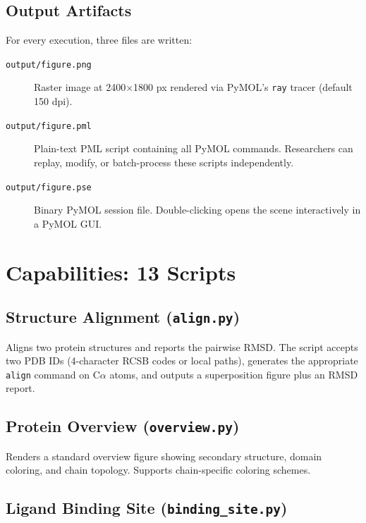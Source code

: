 \documentclass[12pt,a4paper]{article}
\begin{document}
\subsection{Output Artifacts}

For every execution, three files are written:

\begin{description}
  \item[\texttt{output/figure.png}] Raster image at 2400$\times$1800 px rendered via PyMOL's \texttt{ray} tracer (default 150 dpi).
  \item[\texttt{output/figure.pml}] Plain-text PML script containing all PyMOL commands. Researchers can replay, modify, or batch-process these scripts independently.
  \item[\texttt{output/figure.pse}] Binary PyMOL session file. Double-clicking opens the scene interactively in a PyMOL GUI.
\end{description}

\section{Capabilities: 13 Scripts}



\subsection{Structure Alignment (\texttt{align.py})}
\label{sec:align}

Aligns two protein structures and reports the pairwise RMSD. The script accepts two PDB IDs (4-character RCSB codes or local paths), generates the appropriate \texttt{align} command on C$\alpha$ atoms, and outputs a superposition figure plus an RMSD report.

\subsection{Protein Overview (\texttt{overview.py})}
\label{sec:overview}

Renders a standard overview figure showing secondary structure, domain coloring, and chain topology. Supports chain-specific coloring schemes.

\subsection{Ligand Binding Site (\texttt{binding\_site.py})}
\label{sec:binding_site}
\end{document}
